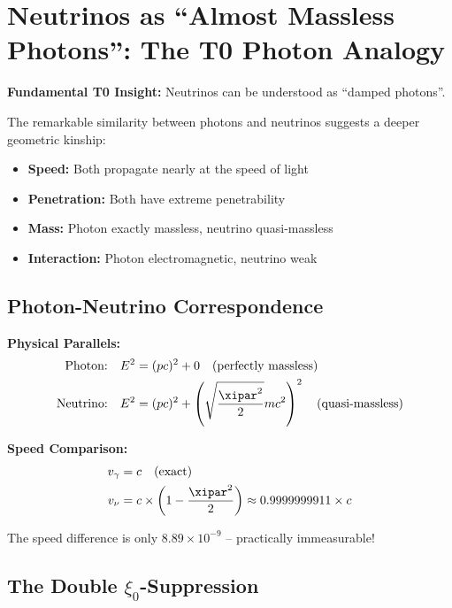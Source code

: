 	\section{Neutrinos as ``Almost Massless Photons'': The T0 Photon Analogy}
	
	\begin{speculation}
		\textbf{Fundamental T0 Insight:} Neutrinos can be understood as ``damped photons''.
		
		The remarkable similarity between photons and neutrinos suggests a deeper geometric kinship:
		\begin{itemize}
			\item \textbf{Speed:} Both propagate nearly at the speed of light
			\item \textbf{Penetration:} Both have extreme penetrability
			\item \textbf{Mass:} Photon exactly massless, neutrino quasi-massless
			\item \textbf{Interaction:} Photon electromagnetic, neutrino weak
		\end{itemize}
	\end{speculation}
	
	\subsection{Photon-Neutrino Correspondence}
	
	\begin{photon}
		\textbf{Physical Parallels:}
		\begin{align}
			\text{Photon:} \quad &E^2 = (pc)^2 + 0 \quad \text{(perfectly massless)} \\
			\text{Neutrino:} \quad &E^2 = (pc)^2 + \left(\sqrt{\frac{\xipar^2}{2}} m c^2\right)^2 \quad \text{(quasi-massless)}
		\end{align}
		
		\textbf{Speed Comparison:}
		\begin{align}
			v_\gamma &= c \quad \text{(exact)} \\
			v_\nu &= c \times \left(1 - \frac{\xipar^2}{2}\right) \approx 0.9999999911 \times c
		\end{align}
		
		The speed difference is only $8.89 \times 10^{-9}$ -- practically immeasurable!
	\end{photon}
	
	\subsection{The Double $\xi_0$-Suppression}
	

